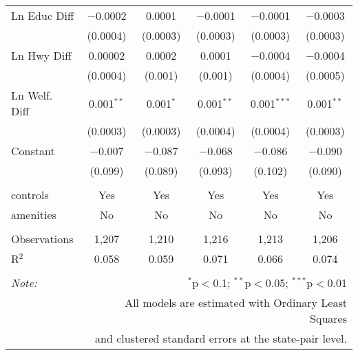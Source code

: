 \begin{table}[!htbp]
\begin{tabular}{@{\extracolsep{5pt}}lccccc}
  Ln Educ Diff & $-$0.0002 & 0.0001 & $-$0.0001 & $-$0.0001 & $-$0.0003 \\ 
  & (0.0004) & (0.0003) & (0.0003) & (0.0003) & (0.0003) \\ 
  Ln Hwy Diff & 0.00002 & 0.0002 & 0.0001 & $-$0.0004 & $-$0.0004 \\ 
  & (0.0004) & (0.001) & (0.001) & (0.0004) & (0.0005) \\ 
  Ln Welf. Diff & 0.001$^{**}$ & 0.001$^{*}$ & 0.001$^{**}$ & 0.001$^{***}$ & 0.001$^{**}$ \\ 
  & (0.0003) & (0.0003) & (0.0004) & (0.0004) & (0.0003) \\ 
  Constant & $-$0.007 & $-$0.087 & $-$0.068 & $-$0.086 & $-$0.090 \\ 
  & (0.099) & (0.089) & (0.093) & (0.102) & (0.090) \\ 
 \hline \\[-1.8ex] 
controls & Yes & Yes & Yes & Yes & Yes \\ 
amenities & No & No & No & No & No \\ 
\hline \\[-1.8ex] 
Observations & 1,207 & 1,210 & 1,216 & 1,213 & 1,206 \\ 
R$^{2}$ & 0.058 & 0.059 & 0.071 & 0.066 & 0.074 \\ 
\hline 
\hline \\[-1.8ex] 
\textit{Note:}  & \multicolumn{5}{r}{$^{*}$p$<$0.1; $^{**}$p$<$0.05; $^{***}$p$<$0.01} \\ 
 & \multicolumn{5}{r}{All models are estimated with Ordinary Least Squares} \\ 
 & \multicolumn{5}{r}{and clustered standard errors at the state-pair level.} \\ 
\end{tabular} 
\end{table} 
